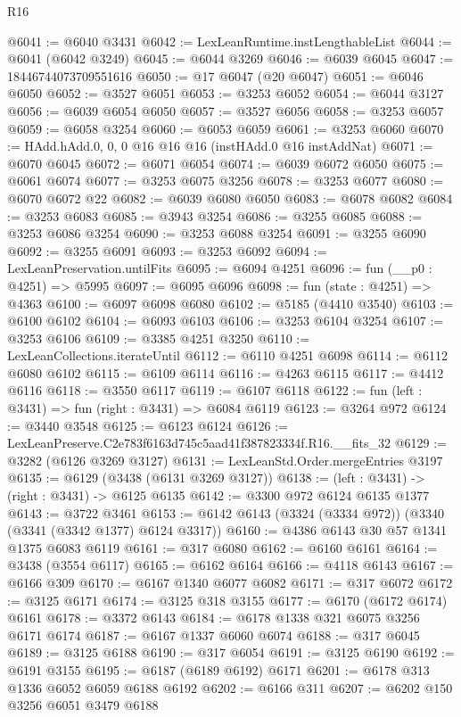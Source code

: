 \begin{lexlean}{R16}
\begin{coremodule}
@6041 := @6040 @3431
@6042 := LexLeanRuntime.instLengthableList
@6044 := @6041 (@6042 @3249)
@6045 := @6044 @3269
@6046 := @6039 @6045
@6047 := 18446744073709551616
@6050 := @17 @6047 (@20 @6047)
@6051 := @6046 @6050
@6052 := @3527 @6051
@6053 := @3253 @6052
@6054 := @6044 @3127
@6056 := @6039 @6054 @6050
@6057 := @3527 @6056
@6058 := @3253 @6057
@6059 := @6058 @3254
@6060 := @6053 @6059
@6061 := @3253 @6060
@6070 := HAdd.hAdd.{0, 0, 0} @16 @16 @16 (instHAdd.{0} @16 instAddNat)
@6071 := @6070 @6045
@6072 := @6071 @6054
@6074 := @6039 @6072 @6050
@6075 := @6061 @6074
@6077 := @3253 @6075 @3256
@6078 := @3253 @6077
@6080 := @6070 @6072 @22
@6082 := @6039 @6080 @6050
@6083 := @6078 @6082
@6084 := @3253 @6083
@6085 := @3943 @3254
@6086 := @3255 @6085
@6088 := @3253 @6086 @3254
@6090 := @3253 @6088 @3254
@6091 := @3255 @6090
@6092 := @3255 @6091
@6093 := @3253 @6092
@6094 := LexLeanPreservation.untilFits
@6095 := @6094 @4251
@6096 := fun (__p0 : @4251) => @5995
@6097 := @6095 @6096
@6098 := fun (state : @4251) => @4363
@6100 := @6097 @6098 @6080
@6102 := @5185 (@4410 @3540)
@6103 := @6100 @6102
@6104 := @6093 @6103
@6106 := @3253 @6104 @3254
@6107 := @3253 @6106
@6109 := @3385 @4251 @3250
@6110 := LexLeanCollections.iterateUntil
@6112 := @6110 @4251 @6098
@6114 := @6112 @6080 @6102
@6115 := @6109 @6114
@6116 := @4263 @6115
@6117 := @4412 @6116
@6118 := @3550 @6117
@6119 := @6107 @6118
@6122 := fun (left : @3431) => fun (right : @3431) => @6084 @6119
@6123 := @3264 @972
@6124 := @3440 @3548
@6125 := @6123 @6124
@6126 := LexLeanPreserve.C2e783f6163d745c5aad41f387823334f.R16.__fits_32
@6129 := @3282 (@6126 @3269 @3127)
@6131 := LexLeanStd.Order.mergeEntries @3197
@6135 := @6129 (@3438 (@6131 @3269 @3127))
@6138 := (left : @3431) -> (right : @3431) -> @6125 @6135
@6142 := @3300 @972 @6124 @6135 @1377
@6143 := @3722 @3461
@6153 := @6142 @6143 (@3324 (@3334 @972)) (@3340 (@3341 (@3342 @1377) @6124 @3317))
@6160 := @4386 @6143 @30 @57 @1341 @1375 @6083 @6119
@6161 := @317 @6080
@6162 := @6160 @6161
@6164 := @3438 (@3554 @6117)
@6165 := @6162 @6164
@6166 := @4118 @6143
@6167 := @6166 @309
@6170 := @6167 @1340 @6077 @6082
@6171 := @317 @6072
@6172 := @3125 @6171
@6174 := @3125 @318 @3155
@6177 := @6170 (@6172 @6174) @6161
@6178 := @3372 @6143
@6184 := @6178 @1338 @321 @6075 @3256 @6171 @6174
@6187 := @6167 @1337 @6060 @6074
@6188 := @317 @6045
@6189 := @3125 @6188
@6190 := @317 @6054
@6191 := @3125 @6190
@6192 := @6191 @3155
@6195 := @6187 (@6189 @6192) @6171
@6201 := @6178 @313 @1336 @6052 @6059 @6188 @6192
@6202 := @6166 @311
@6207 := @6202 @150 @3256 @6051 @3479 @6188

\end{coremodule}
\end{lexlean}
